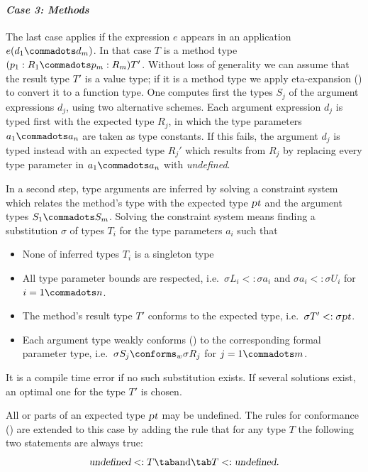 \paragraph{\em Case 3: Methods} The last case applies if the expression
$e$ appears in an application $e(d_1 \commadots d_m)$. In that case
$T$ is a method type $(p_1:R_1 \commadots p_m:R_m)T'$. Without loss of
generality we can assume that the result type $T'$ is a value type; if
it is a method type we apply eta-expansion () to
convert it to a function type.  One computes first the types $S_j$ of
the argument expressions $d_j$, using two alternative schemes.  Each
argument expression $d_j$ is typed first with the expected type $R_j$,
in which the type parameters $a_1 \commadots a_n$ are taken as type
constants.  If this fails, the argument $d_j$ is typed instead with an
expected type $R_j'$ which results from $R_j$ by replacing every type
parameter in $a_1 \commadots a_n$ with {\sl undefined}.

In a second step, type arguments are inferred by solving a constraint
system which relates the method's type with the expected type
$\mbox{\sl pt}$ and the argument types $S_1 \commadots S_m$. Solving the
constraint system means
finding a substitution $\sigma$ of types $T_i$ for the type parameters
$a_i$ such that
\begin{itemize}
\item
None of inferred types $T_i$ is a singleton type 
\item 
All type parameter bounds are respected, i.e.\ 
$\sigma L_i <: \sigma a_i$ and $\sigma a_i <: \sigma U_i$ for $i = 1 \commadots n$.
\item 
The method's result type $T'$ conforms to the expected type, i.e.\ 
$\sigma T' <: \sigma \mbox{\sl pt}$.
\item
Each argument type weakly conforms () 
to the corresponding formal parameter
type, i.e.\ 
$\sigma S_j \conforms_w \sigma R_j$ for $j = 1 \commadots m$.
\end{itemize}
It is a compile time error if no such substitution exists.  If several
solutions exist, an optimal one for the type $T'$ is chosen.

All or parts of an expected type $\mbox{\sl pt}$ may be undefined. The rules for
conformance (\sref{sec:conformance}) are extended to this case by adding
the rule that for any type $T$ the following two statements are always
true:
\[
   \mbox{\sl undefined} <: T \tab\mbox{and}\tab T <: \mbox{\sl undefined} .
\]

